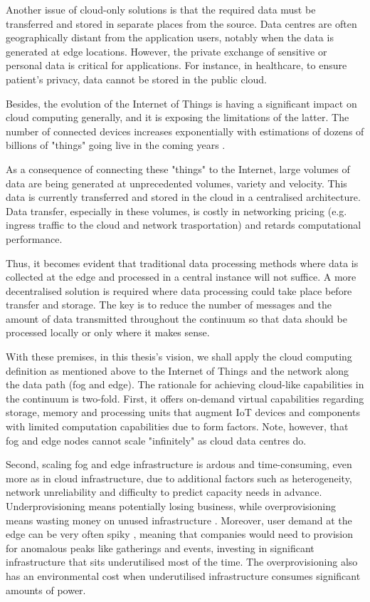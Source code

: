 Another issue of cloud-only solutions is that the required data must be transferred and stored in separate places from the source. Data centres are often geographically distant from the application users, notably when the data is generated at edge locations. However, the private exchange of sensitive or personal data is critical for applications. For instance, in healthcare, to ensure patient's privacy, data cannot be stored in the public cloud.

Besides, the evolution of the Internet of Things is having a significant impact on cloud computing generally, and it is exposing the limitations of the latter. The number of connected devices increases exponentially with estimations of dozens of billions of "things" going live in the coming years \cite{gartner-iot}.

As a consequence of connecting these "things" to the Internet, large volumes of data are being generated at unprecedented volumes, variety and velocity. This data is currently transferred and stored in the cloud in a centralised architecture. Data transfer, especially in these volumes, is costly in networking pricing (e.g. ingress traffic to the cloud and network trasportation) and retards computational performance.

Thus, it becomes evident that traditional data processing methods where data is collected at the edge and processed in a central instance will not suffice. A more decentralised solution is required where data processing could take place before transfer and storage. The key is to reduce the number of messages and the amount of data transmitted throughout the continuum so that data should be processed locally or only where it makes sense.

With these premises, in this thesis's vision, we shall apply the cloud computing definition as mentioned above to the Internet of Things and the network along the data path (fog and edge). The rationale for achieving cloud-like capabilities in the continuum is two-fold. First, it offers on-demand virtual capabilities regarding storage, memory and processing units that augment IoT devices and components with limited computation capabilities due to form factors. Note, however, that fog and edge nodes cannot scale "infinitely" as cloud data centres do.

Second, scaling fog and edge infrastructure is ardous and time-consuming, even more as in cloud infrastructure, due to additional factors such as heterogeneity, network unreliability and difficulty to predict capacity needs in advance. Underprovisioning means potentially losing business, while overprovisioning means wasting money on unused infrastructure \cite{akamai}.  Moreover, user demand at the edge can be very often spiky \cite{akamai}, meaning that companies would need to provision for anomalous peaks like gatherings and events, investing in significant infrastructure that sits underutilised most of the time. The overprovisioning also has an environmental cost when underutilised infrastructure consumes significant amounts of power.

